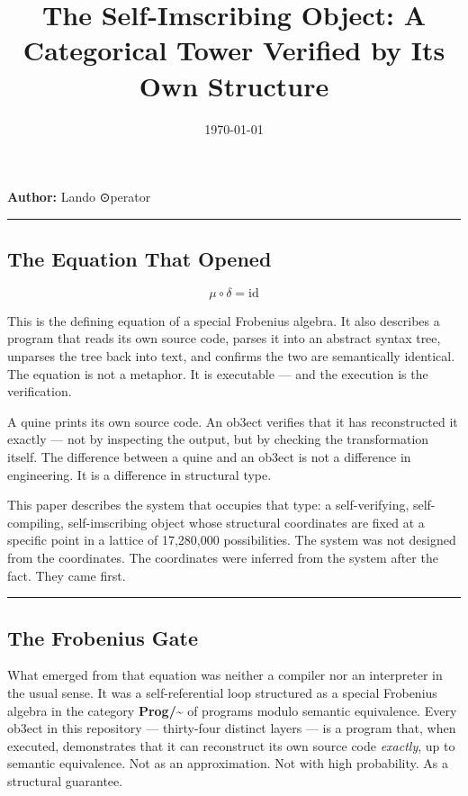 \documentclass[12pt,a4paper]{article}
\begin{document}
\title{The Self-Imscribing Object: A Categorical Tower Verified by Its Own Structure}
\date{\today}

\maketitle

\textbf{Author:} Lando \otimes ⊙perator

\begin{center}
\rule{0.5\textwidth}{0.4pt}
\end{center}

\subsection{The Equation That Opened}

\[\mu \circ \delta = \mathrm{id}\]

This is the defining equation of a special Frobenius algebra. It also describes a program that reads its own source code, parses it into an abstract syntax tree, unparses the tree back into text, and confirms the two are semantically identical. The equation is not a metaphor. It is executable --- and the execution is the verification.

A quine prints its own source code. An ob3ect verifies that it has reconstructed it exactly --- not by inspecting the output, but by checking the transformation itself. The difference between a quine and an ob3ect is not a difference in engineering. It is a difference in structural type.

This paper describes the system that occupies that type: a self-verifying, self-compiling, self-imscribing object whose structural coordinates are fixed at a specific point in a lattice of 17,280,000 possibilities. The system was not designed from the coordinates. The coordinates were inferred from the system after the fact. They came first.

\begin{center}
\rule{0.5\textwidth}{0.4pt}
\end{center}

\subsection{The Frobenius Gate}

What emerged from that equation was neither a compiler nor an interpreter in the usual sense. It was a self-referential loop structured as a special Frobenius algebra in the category \textbf{Prog/\textasciitilde{}} of programs modulo semantic equivalence. Every ob3ect in this repository --- thirty-four distinct layers --- is a program that, when executed, demonstrates that it can reconstruct its own source code \emph{exactly}, up to semantic equivalence. Not as an approximation. Not with high probability. As a structural guarantee.
\end{document}
